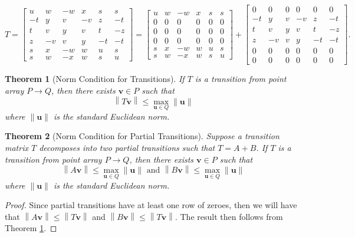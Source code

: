 \documentclass[a4paper,10pt]{article}
\theoremstyle{plain}
\newtheorem{Theorem}{Theorem}
\theoremstyle{definition}
\theoremstyle{remark}
\renewcommand{\vec}[1]{\mathbf{#1}}
\newcommand\norm[1]{\left\lVert#1\right\rVert}
\begin{document}
\[T = \begin{bmatrix}
	u  & w  & -w & x  & s  & s  \\
	-t & y  & v  & -v & z  & -t \\
	t  & v  & y  & v  & t  & -z \\
	z  & -v & v  & y  & -t & -t \\
	s  & x  & -w & w  & u  & s  \\
	s  & w  & -x & w  & s  & u
\end{bmatrix} = \begin{bmatrix}
	u  & w  & -w & x  & s  & s  \\
	0 & 0 & 0 & 0 & 0 & 0 \\
	0 & 0 & 0 & 0 & 0 & 0 \\
	0 & 0 & 0 & 0 & 0 & 0 \\
	s  & x  & -w & w  & u  & s  \\
	s  & w  & -x & w  & s  & u
\end{bmatrix} + \begin{bmatrix}
	0 & 0 & 0 & 0 & 0 & 0 \\
	-t & y  & v  & -v & z  & -t \\
	t  & v  & y  & v  & t  & -z \\
	z  & -v & v  & y  & -t & -t \\
	0 & 0 & 0 & 0 & 0 & 0 \\
	0 & 0 & 0 & 0 & 0 & 0
\end{bmatrix}.\]


\begin{Theorem}[Norm Condition for Transitions]
	If \( T \) is a transition from point array \( P \to Q \), then there exists \( \vec{v} \in P \) such that
	\[\norm{T\vec{v}} \leq \max_{\vec{u} \in Q}\norm{\vec{u}}\]
	where \( \norm{\vec{u}} \) is the standard Euclidean norm.
	\label{thrm:norm-condition-for-transitions}
\end{Theorem}
\begin{Theorem}[Norm Condition for Partial Transitions]
		Suppose a transition matrix \( T \) decomposes into two partial transitions such that \( T = A + B \).
		If \( T \) is a transition from point array \( P \to Q \), then there exists \( \vec{v} \in P \) such that
		\[\norm{A\vec{v}} \leq \max_{\vec{u} \in Q}\norm{\vec{u}} \text{ and } \norm{B\vec{v}} \leq \max_{\vec{u} \in Q}\norm{\vec{u}}\]
		where \( \norm{\vec{u}} \) is the standard Euclidean norm.
\end{Theorem}
\begin{proof}
	Since partial transitions have at least one row of zeroes, then we will have that \( \norm{A\vec{v}} \leq \norm{T\vec{v}} \) and \( \norm{B\vec{v}} \leq \norm{T\vec{v}} \).
	The result then follows from Theorem \ref{thrm:norm-condition-for-transitions}.
\end{proof}
\end{document}
